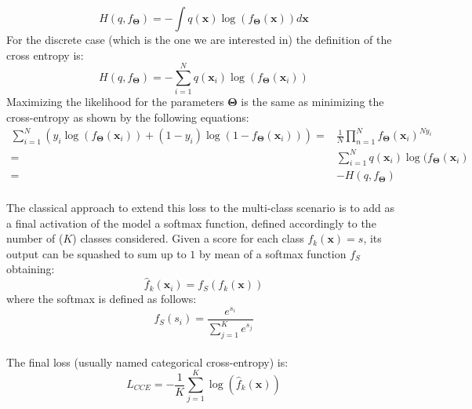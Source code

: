 \documentclass[sn-mathphys-num]{sn-jnl}%
\renewcommand\vec{\mathbf}
\begin{document}
\begin{equation}
     H(q,f_{\vec{\Theta}}) = - \int q(\vec{x})\log(f_{\vec{\Theta}}(\vec{x}))d\vec{x}
\end{equation}
For the discrete case (which is the one we are interested in) the definition of the cross entropy is:
\begin{equation}
    H(q,f_{\vec{\Theta}}) = - \sum_{i=1}^{N} q(\vec{x}_i)\log(f_{\vec{\Theta}}(\vec{x}_i))
\end{equation}
Maximizing the likelihood for the parameters $\vec{\Theta}$ is the same as minimizing the cross-entropy as shown by the following equations:
\begin{align}\label{eq:cross_entropy_nll}
        \sum_{i=1}^{N}(y_i \log(f_{\vec{\Theta}}(\vec{x}_i)) + (1-y_i) \log(1 - f_{\vec{\Theta}}(\vec{x}_i)))
 = &\frac{1}{N} \prod_{n=1}^{N}f_{\vec{\Theta}}(\vec{x}_i)^{Ny_i}\\
 = & \sum_{i=1}^{N}q(\vec{x}_i)\log(f_{\vec{\Theta}}(\vec{x}_i)\\ = & -H(q,f_{\vec{\Theta}})
 \end{align}
\\
The classical approach to extend this loss to the multi-class scenario is to add as a final activation of the model a softmax function, defined accordingly to the number of ($K$) classes considered. 
Given a score for each class $f_k(\vec{x}) = s$, its output can be squashed to sum up to $1$ by mean of a softmax function $f_S$ obtaining:
\begin{equation}
    \widehat{f}_k(\vec{x}_i) = f_S(f_k(\vec{x}))
\end{equation}
where the softmax is defined as follows:
\begin{equation}\label{eq:softmax}
    f_S(s_i) = \frac{e^{s_i}}{\sum_{j=1}^{K} e^{s_j}}
\end{equation}
\\
The final loss (usually named categorical cross-entropy) is:
\begin{equation}
    L_{CCE} = -\frac{1}{K}\sum_{j=1}^{K}\log(\widehat{f}_k(\vec{x}))
\end{equation}
\end{document}
